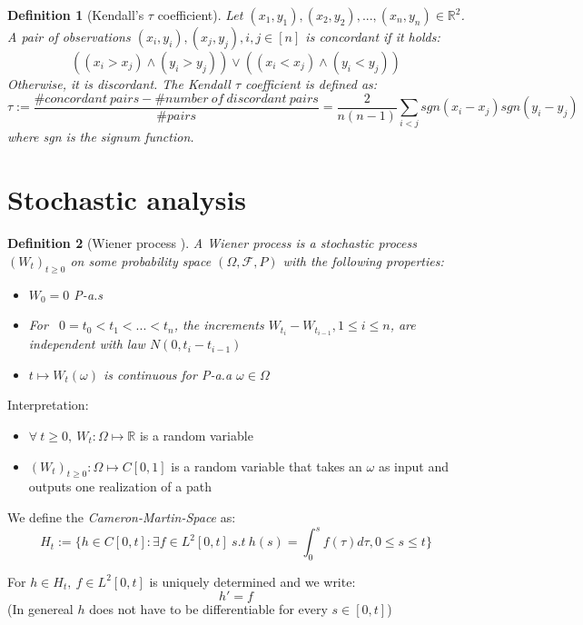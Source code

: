 \documentclass[%
thesis=student,%
coverpage=false,%
titlepage=false,%
headmarks=true, %
english,%
font=libertine, %
math=newpxtx, %
BCOR=5mm,%
coverBCOR=11mm%
]{tumbook}
\newtheorem{definition}{Definition}[section]
\begin{document}
\begin{definition}[Kendall's $\tau$ coefficient]
\label{def:Kendall tau}
Let $(x_{1},y_{1}),(x_{2},y_{2}),...,(x_{n},y_{n})\in \mathbb{R}^{2}$. A pair of observations $(x_{i},y_{i}),(x_{j},y_{j}), i,j \in [n]$ is concordant if it holds:
\[
((x_{i} > x_{j}) \wedge (y_{i} > y_{j})) \vee
((x_{i} < x_{j}) \wedge (y_{i} < y_{j}))
\]
Otherwise, it is discordant. The Kendall $\tau$ coefficient is defined as:
\[
\tau := \frac{\#concordant\ pairs - \#number\ of\ discordant\ pairs}{\#pairs} = \frac{2}{n(n-1)}\sum_{i<j}sgn(x_{i}-x_{j})sgn(y_{i}-y_{j})
\]
where sgn is the signum function.    
\end{definition}


\section{Stochastic analysis}
\label{stochastic analysis}

\begin{definition}[Wiener process \cite{gantert:2024}]
A Wiener process is a stochastic process $(W_{t})_{t\geq 0}$ on some probability space $(\Omega,\mathcal{F},P)$ with the following properties: 
\begin{itemize}
    \item $W_{0} = 0$ P-a.s
    \item For \ $0 = t_{0} < t_{1} < ... < t_{n}$, the increments $W_{t_{i}} - W_{t_{i-1}}, 1 \leq i \leq n$, are independent with law $N(0,t_{i}-t_{i-1})$
    \item $t \mapsto W_{t}(\omega)$ is continuous for P-a.a $\omega \in \Omega$
\end{itemize}
\end{definition}

Interpretation: 

\begin{itemize}
    \item $\forall \ t \geq 0, \ W_{t}: \Omega \mapsto \mathbb{R}$ is a random variable 
    \item $(W_{t})_{t \geq 0} : \Omega \mapsto C[0,1]$ is a random variable that takes an $\omega$ as input and outputs one realization of a path
\end{itemize}

We define the \textit{Cameron-Martin-Space} as:
\[
H_{t} := \{ h \in C[0,t]: \exists f \in L^{2}[0,t] \ s.t \  h(s) = \int_{0}^{s} f(\tau) d\tau, 0 \leq s \leq t \}
\]

For $h \in H_{t},\ f \in L^{2}[0,t]$ is uniquely determined and we write: 
\[
h' = f
\]
(In genereal $h$ does not have to be differentiable for every $s \in [0,t]$)
\end{document}
